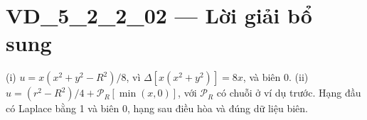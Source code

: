 \documentclass[10pt,a4paper]{article}
\begin{document}
\section*{VD\_5\_2\_2\_02 — Lời giải bổ sung}
(i) $u=x(x^2+y^2-R^2)/8$, vì $\Delta[x(x^2+y^2)]=8x$, và biên 0.
(ii) $u=(r^2-R^2)/4+\mathcal P_R[\min(x,0)]$, với $\mathcal P_R$ có chuỗi ở ví dụ trước. Hạng đầu có Laplace bằng 1 và biên 0, hạng sau điều hòa và đúng dữ liệu biên.
\end{document}
